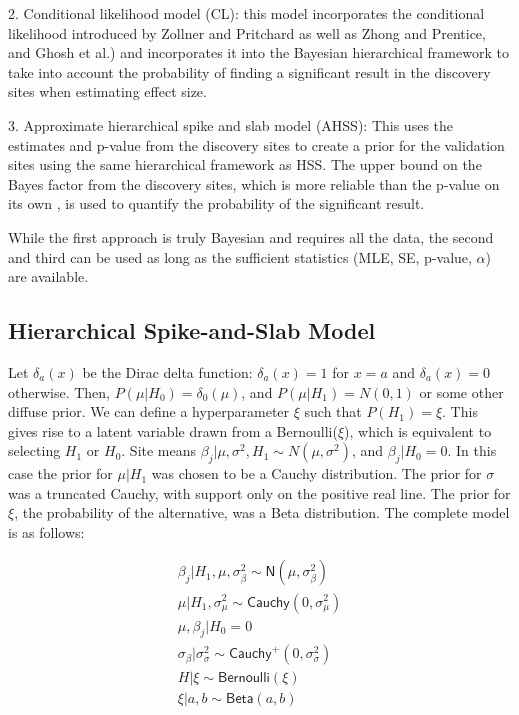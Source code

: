 \documentclass[AMA,STIX1COL]{WileyNJD-v2}\usepackage[]{graphicx}\usepackage[]{color}
\begin{document}
2. Conditional likelihood model (CL): this model incorporates the conditional likelihood introduced by Zollner and Pritchard as well as Zhong and Prentice, and Ghosh et al.)\cite{zollner2007overcoming, zhong2008bias, ghosh2008estimating} and incorporates it into the Bayesian hierarchical framework to take into account the probability of finding a significant result in the discovery sites when estimating effect size. 

3. Approximate hierarchical spike and slab model (AHSS): This uses the estimates and p-value from the discovery sites to create a prior for the validation sites using the same hierarchical framework as HSS. The upper bound on the Bayes factor from the discovery sites, which is more reliable than the p-value on its own \cite{benjamin2017redefine}, is used to quantify the probability of the significant result.

While the first approach is truly Bayesian and requires all the data, the second and third can be used as long as the sufficient statistics (MLE, SE, p-value, $\alpha$) are available. 


\subsection{Hierarchical Spike-and-Slab Model}

Let $\delta_a(x)$ be the Dirac delta function: $\delta_a(x) = 1$ for $x = a$ and $\delta_a(x)=0$ otherwise. Then, $P( \mu|H_0) = \delta_0 ( \mu )$,  and $P( \mu|H_1) = N(0,1)$ or some other diffuse prior. We can define a hyperparameter $\xi$ such that $P(H_1) = \xi$. This gives rise to a latent variable drawn from a Bernoulli($\xi$), which is equivalent to selecting $H_1$ or $H_0$. Site means $\beta_{j}|\mu, \sigma^2,H_1 \sim N(\mu, \sigma^2)$, and $\beta_{j}|H_0 = 0$. In this case the prior for  $\mu| H_1$ was chosen to be a Cauchy distribution. The prior for $\sigma$ was a truncated Cauchy, with support only on the positive real line. The prior for $\xi$, the probability of the alternative, was a Beta distribution.  The complete model is as follows:

\begin{gather}\label{eq3}
\beta_{j}|H_ 1,\mu, \sigma_{\beta}^{2} \sim \textsf{N}(\mu, \sigma_{\beta}^{2}) \\
\mu|H_1,\sigma_{\mu}^{2} \sim \textsf{Cauchy}(0,\sigma_{\mu}^{2})\\
\mu, \beta_{j}|H_0  =0\\
\sigma_{\beta}| \sigma_{\sigma}^{2}\sim \textsf{Cauchy}^+(0,\sigma_{\sigma}^{2})\\
H|\xi\sim \textsf{Bernoulli}(\xi)\\
\xi|a, b \sim \textsf{Beta}(a, b)
\end{gather}
\end{document}
